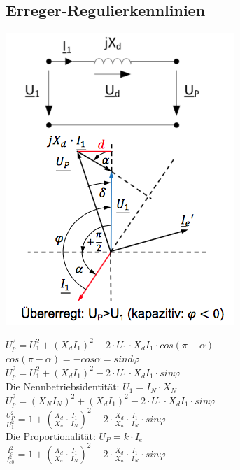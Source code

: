 \subsection{Erreger-Regulierkennlinien}
\begin{minipage}{0.25 \linewidth}
\includegraphics[width =  \linewidth]{./Pics/VL910/Leistung}
\end{minipage}
\begin{minipage}{0.75 \linewidth}
$U_p^2 = U_1^2 + (X_d I_1)^2 - 2 \cdot U_1 \cdot X_d I_1 \cdot cos(\pi-\alpha)$\\

$cos(\pi - \alpha) = - cos\alpha = sind \varphi$ \\

$U_p^2 = U_1^2 + (X_d I_1)^2 - 2 \cdot U_1 \cdot X_d I_1 \cdot sin\varphi$\\

Die Nennbetriebsidentität: $U_1 = I_N \cdot X_N$ \\

$U_p^2 = (X_N I_N)^2+ (X_d I_1)^2 - 2 \cdot U_1 \cdot X_d I_1 \cdot sin\varphi$\\

$\frac{U_P^2}{U_1^2} = 1 + (\frac{X_d}{X_n} \cdot \frac{I_1}{I_N})^2 - 2 \cdot \frac{X_d}{X_n} \cdot \frac{I_1}{I_N} \cdot sin\varphi$\\

Die Proportionalität: $U_P = k \cdot I_e$ \\

$\frac{I_e^2}{I_{e0}^2} = 1 + (\frac{X_d}{X_n} \cdot \frac{I_1}{I_N})^2 - 2 \cdot \frac{X_d}{X_n} \cdot \frac{I_1}{I_N} \cdot sin\varphi$\\

\end{minipage}
